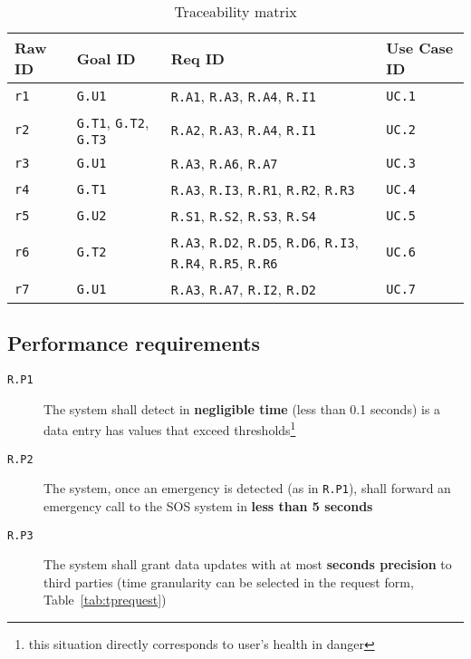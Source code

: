     \begin{table}[h!]
      \centering
      \begin{tabularx}{.8\linewidth}{|X|X|X|X|}
        \hline
        \textbf{Raw ID} & \textbf{Goal ID} & \textbf{Req ID} & \textbf{Use Case ID} \\ \hline
        \texttt{r1} & \texttt{G.U1} & \texttt{R.A1}, \texttt{R.A3}, \texttt{R.A4}, \texttt{R.I1} & \texttt{UC.1} \\
        \hline
        \texttt{r2} & \texttt{G.T1}, \texttt{G.T2}, \texttt{G.T3} & \texttt{R.A2}, \texttt{R.A3}, \texttt{R.A4}, \texttt{R.I1} & \texttt{UC.2} \\
        \hline
        \texttt{r3} & \texttt{G.U1} & \texttt{R.A3}, \texttt{R.A6}, \texttt{R.A7} & \texttt{UC.3} \\
        \hline
        \texttt{r4} & \texttt{G.T1} & \texttt{R.A3}, \texttt{R.I3}, \texttt{R.R1}, \texttt{R.R2}, \texttt{R.R3}& \texttt{UC.4}  \\
        \hline
        \texttt{r5} & \texttt{G.U2} & \texttt{R.S1},  \texttt{R.S2}, \texttt{R.S3}, \texttt{R.S4} & \texttt{UC.5} \\
        \hline
        \texttt{r6} & \texttt{G.T2} & \texttt{R.A3},  \texttt{R.D2}, \texttt{R.D5}, \texttt{R.D6}, \texttt{R.I3}, \texttt{R.R4}, \texttt{R.R5}, \texttt{R.R6} & \texttt{UC.6}   \\
        \hline
        \texttt{r7} & \texttt{G.U1} & \texttt{R.A3}, \texttt{R.A7},  \texttt{R.I2},  \texttt{R.D2} & \texttt{UC.7}   \\
        \hline
      \end{tabularx}
      \caption{Traceability matrix}
      \label{tab:tracmatrix}
    \end{table}

  \clearpage
  \subsection{Performance requirements}
  \label{sec:performance}

    \begin{description}
      \item[\texttt{R.P1}] The system shall detect in \textbf{negligible time} (less than 0.1 seconds) is a data entry has values that exceed thresholds\footnote{this situation directly corresponds to user's health in danger}
      \item[\texttt{R.P2}] The system, once an emergency is detected (as in \texttt{R.P1}), shall forward an emergency call to the SOS system in \textbf{less than 5 seconds}
      \item[\texttt{R.P3}] The system shall grant data updates with at most \textbf{seconds precision} to third parties (time granularity can be selected in the request form, Table~\ref{tab:tprequest})
    \end{description}

